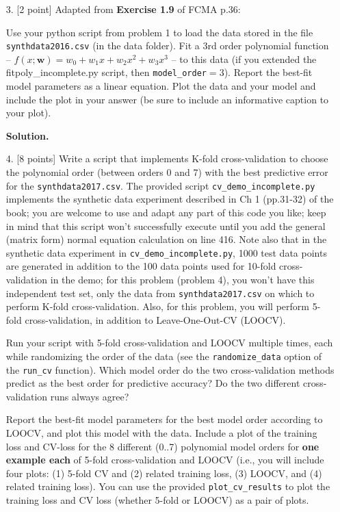 \documentclass[10pt]{article}
\begin{document}
\begin{itemize}
{\bf Solution.} 




\item[3.] [2 point]
Adapted from {\bf Exercise 1.9} of FCMA p.36:

Use your python script from problem 1 to load the data stored in the file {\tt synthdata2016.csv} (in the data folder).  Fit a 3rd order polynomial function -- $f(x; \mathbf{w}) = w_0 + w_1 x + w_2 x^2 + w_3 x^3$ -- to this data (if you extended the {fitpoly\_incomplete.py} script, then {\tt model\_order}$ = 3$).  
Report the best-fit model parameters as a linear equation.  Plot the data and your model and include the plot in your answer (be sure to include an informative caption to your plot).

{\bf Solution.} 




\item[4.] [8 points]
Write a script that implements K-fold cross-validation to choose the polynomial order (between orders 0 and 7) with the best predictive error for the {\tt synthdata2017.csv}.  The provided script {\tt cv\_demo\_incomplete.py} implements the synthetic data experiment described in Ch 1 (pp.31-32) of the book; you are welcome to use and adapt any part of this code you like; keep in mind that this script won't successfully execute until you add the general (matrix form) normal equation calculation on line 416.
Note also that in the synthetic data experiment in {\tt cv\_demo\_incomplete.py}, 1000 test data points are generated in addition to the 100 data points used for 10-fold cross-validation in the demo; for this problem (problem 4), you won't have this independent test set, only the data from {\tt synthdata2017.csv} on which to perform K-fold cross-validation.  Also, for this problem, you will perform 5-fold cross-validation, in addition to Leave-One-Out-CV (LOOCV).

Run your script with 5-fold cross-validation and LOOCV multiple times, each while randomizing the order of the data (see the {\tt randomize\_data} option of the {\tt run\_cv} function).
Which model order do the two cross-validation methods predict as the best order for predictive accuracy?
Do the two different cross-validation runs always agree?

Report the best-fit model parameters for the best model order according to LOOCV, and plot this model with the data.
Include a plot of the training loss and CV-loss for the 8 different (0..7) polynomial model orders for {\bf one example each} of 5-fold cross-validation and LOOCV (i.e., you will include four plots: (1) 5-fold CV and (2) related training loss, (3) LOOCV, and (4) related training loss).  You can use the provided {\tt plot\_cv\_results} to plot the training loss and CV loss (whether 5-fold or LOOCV) as a pair of plots.


\end{itemize}
\end{document}
